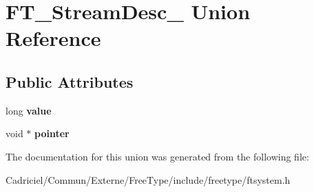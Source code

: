 \hypertarget{union_f_t___stream_desc__}{}\section{F\+T\+\_\+\+Stream\+Desc\+\_\+ Union Reference}
\label{union_f_t___stream_desc__}
\subsection*{Public Attributes}
\begin{DoxyCompactItemize}
\item 
long {\bfseries value}\hypertarget{union_f_t___stream_desc___a1a94493032faef1c3ed7bc33816ce90c}{}\label{union_f_t___stream_desc___a1a94493032faef1c3ed7bc33816ce90c}

\item 
void $\ast$ {\bfseries pointer}\hypertarget{union_f_t___stream_desc___a410ed102dc377fb9a5b9c950c3f863dc}{}\label{union_f_t___stream_desc___a410ed102dc377fb9a5b9c950c3f863dc}

\end{DoxyCompactItemize}


The documentation for this union was generated from the following file\+:\begin{DoxyCompactItemize}
\item 
Cadriciel/\+Commun/\+Externe/\+Free\+Type/include/freetype/ftsystem.\+h\end{DoxyCompactItemize}
